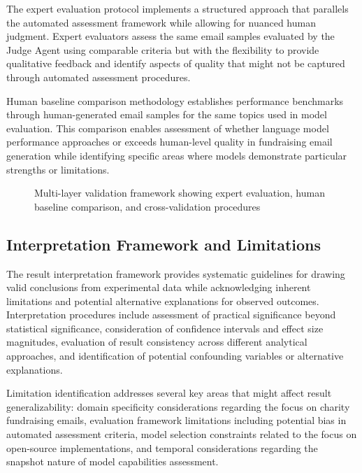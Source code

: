 The expert evaluation protocol implements a structured approach that parallels the automated assessment framework while allowing for nuanced human judgment. Expert evaluators assess the same email samples evaluated by the Judge Agent using comparable criteria but with the flexibility to provide qualitative feedback and identify aspects of quality that might not be captured through automated assessment procedures.

Human baseline comparison methodology establishes performance benchmarks through human-generated email samples for the same topics used in model evaluation. This comparison enables assessment of whether language model performance approaches or exceeds human-level quality in fundraising email generation while identifying specific areas where models demonstrate particular strengths or limitations.

\begin{figure}[htbp]
    \centering
    \caption{Multi-layer validation framework showing expert evaluation, human baseline comparison, and cross-validation procedures}
    \label{fig:validation-framework}
\end{figure}

\subsection{Interpretation Framework and Limitations}

The result interpretation framework provides systematic guidelines for drawing valid conclusions from experimental data while acknowledging inherent limitations and potential alternative explanations for observed outcomes. Interpretation procedures include assessment of practical significance beyond statistical significance, consideration of confidence intervals and effect size magnitudes, evaluation of result consistency across different analytical approaches, and identification of potential confounding variables or alternative explanations.

Limitation identification addresses several key areas that might affect result generalizability: domain specificity considerations regarding the focus on charity fundraising emails, evaluation framework limitations including potential bias in automated assessment criteria, model selection constraints related to the focus on open-source implementations, and temporal considerations regarding the snapshot nature of model capabilities assessment.

